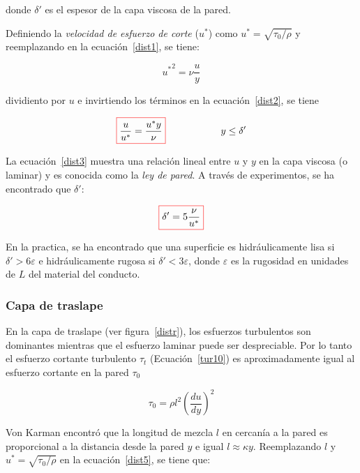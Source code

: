 \documentclass[11pt, oneside]{article}
\begin{document}
donde $\delta '$ es el espesor de la capa viscosa de la pared.

Definiendo la \emph{velocidad de esfuerzo de corte} ($u^*$) como $u^*=\sqrt{\tau_0 / \rho}$ y reemplazando en la ecuaci\'on~\ref{dist1}, se tiene:

\begin{equation}
{u^* }^2 = \nu \frac{u}{y}
\label{dist2}
\end{equation}

dividiento por $u$ e invirtiendo los t\'erminos en la ecuaci\'on~\ref{dist2}, se tiene

\begin{equation}
\color{red}\boxed{\color{black} \frac{u}{u^*} = \frac{u^* y}{\nu} } \hspace{2cm} \color{black} y \leq \delta' 
\label{dist3}
\end{equation}

La ecuaci\'on~\ref{dist3} muestra una relaci\'on lineal entre $u$ y $y$ en la capa viscosa (o laminar) y es conocida como la \emph{ley de pared}. A trav\'es de experimentos, se ha encontrado que $\delta '$:

\begin{equation}
\color{red}\boxed{\color{black} \delta ' = 5 \frac{\nu}{u^* } }
\label{dist4}
\end{equation}

En la practica, se ha encontrado que una superficie es hidr\'aulicamente lisa si $\delta ' > 6 \varepsilon$ e hidr\'aulicamente rugosa si $\delta ' < 3 \varepsilon$, donde $\varepsilon$ es la rugosidad en unidades de $L$ del material del conducto.

\subsubsection*{Capa de traslape} %
En la capa de traslape (ver figura~\ref{distr}),  los esfuerzos turbulentos son dominantes mientras que el esfuerzo laminar puede ser despreciable. Por lo tanto el esfuerzo cortante turbulento  $\tau_t$ (Ecuaci\'on~\ref{tur10}) es aproximadamente igual al esfuerzo cortante en la pared $\tau_0$

\begin{equation}
\tau_0 = \rho l^2 \left( \frac{du}{dy} \right)^2
\label{dist5}
\end{equation}

Von Karman encontr\'o que la longitud de mezcla $l$ en cercan\'ia a la pared es proporcional a la distancia desde la pared $y$ e igual $l \approx \kappa y$. Reemplazando $l$  y $u^* = \sqrt{\tau_0 / \rho}$ en la ecuaci\'on~\ref{dist5}, se tiene que:
\end{document}
